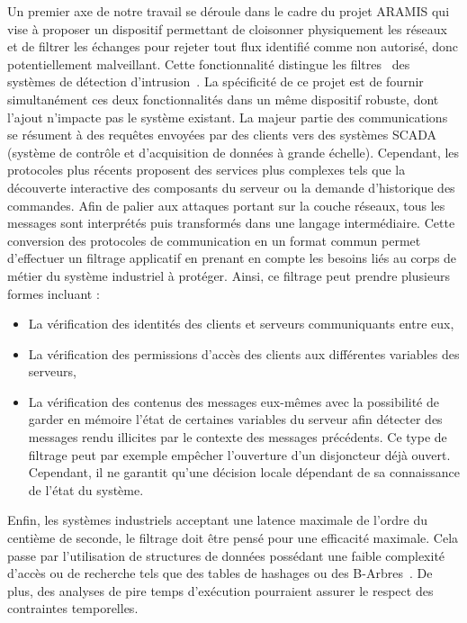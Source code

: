 \documentclass{article}
\newcommand{\aramis}{ARAMIS\xspace}
\begin{document}
Un premier axe de notre travail se déroule dans le cadre du projet \aramis{}
\cite{aramis} qui vise à proposer un dispositif permettant de cloisonner
physiquement les réseaux et de filtrer les échanges pour rejeter tout flux
identifié comme non autorisé, donc potentiellement malveillant.
Cette fonctionnalité distingue les filtres~\cite{DESIRE10,StoneGate11,rWeb13,
DZNetwork14} des systèmes de détection d'intrusion~\cite{StoneGate13,Pax99,
Suricata,Snort}.
La spécificité de ce projet est de fournir simultanément ces deux
fonctionnalités dans un même dispositif robuste, dont l'ajout n'impacte pas le
système existant.
La majeur partie des communications se résument à des requêtes envoyées par des
clients vers des systèmes SCADA (système de contrôle et d'acquisition de données
à grande échelle).
Cependant, les protocoles plus récents proposent des services plus complexes
tels que la découverte interactive des composants du serveur ou la demande
d'historique des commandes.
Afin de palier aux attaques portant sur la couche réseaux, tous les messages
sont interprétés puis transformés dans une langage intermédiaire.
Cette conversion des protocoles de communication en un format commun permet
d'effectuer un filtrage applicatif en prenant en compte les besoins liés au
corps de métier du système industriel à protéger.
Ainsi, ce filtrage peut prendre plusieurs formes incluant :
\begin{itemize}
    \item La vérification des identités des clients et serveurs communiquants
        entre eux,
    \item La vérification des permissions d'accès des clients aux différentes
        variables des serveurs,
    \item La vérification des contenus des messages eux-mêmes avec la
        possibilité de garder en mémoire l'état de certaines variables du
        serveur afin détecter des messages rendu illicites par le contexte des
        messages précédents.
        Ce type de filtrage peut par exemple empêcher l'ouverture d'un
        disjoncteur déjà ouvert.
        Cependant, il ne garantit qu'une décision locale dépendant de sa
        connaissance de l'état du système.
\end{itemize}

Enfin, les systèmes industriels acceptant une latence maximale de l'ordre du
centième de seconde, le filtrage doit être pensé pour une efficacité maximale.
Cela passe par l'utilisation de structures de données possédant une faible 
complexité d'accès ou de recherche tels que des tables de hashages ou des
B-Arbres~\cite{Bay71}.
De plus, des analyses de pire temps d'exécution pourraient assurer le respect
des contraintes temporelles.
\end{document}
